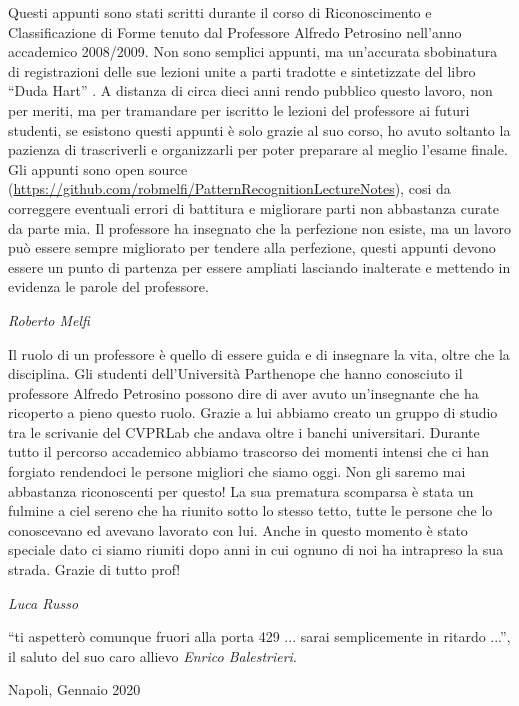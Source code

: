 %
%
%

\preface

Questi appunti sono stati scritti durante il corso di Riconoscimento e Classificazione di Forme tenuto dal Professore Alfredo Petrosino nell’anno accademico 2008/2009. Non sono semplici appunti, ma un’accurata sbobinatura di registrazioni delle sue lezioni unite a parti tradotte e sintetizzate del libro “Duda Hart” \cite{duda}. 
A distanza di circa dieci anni rendo pubblico questo lavoro, non per meriti, ma per tramandare per iscritto le lezioni del professore ai futuri studenti, se esistono questi appunti è solo grazie al suo corso, ho avuto soltanto la pazienza di trascriverli e organizzarli per poter preparare al meglio l’esame finale. \\
Gli appunti sono open source (\url{https://github.com/robmelfi/PatternRecognitionLectureNotes}), cosi da correggere eventuali errori di battitura e migliorare parti non abbastanza curate da parte mia. 
Il professore ha insegnato che la perfezione non esiste, ma un lavoro può essere sempre migliorato per tendere alla perfezione, questi appunti devono essere un punto di partenza per essere ampliati lasciando inalterate e mettendo in evidenza le parole del professore. 




\begin{flushright}\noindent
\hfill {\it Roberto Melfi}\\
\end{flushright}
\vspace{0.5cm}

\noindent Il ruolo di un professore è quello di essere guida e di insegnare la vita, oltre che la disciplina.
Gli studenti dell’Università Parthenope che hanno conosciuto il professore Alfredo Petrosino possono dire di aver avuto un’insegnante che ha ricoperto a pieno questo ruolo.
Grazie a lui abbiamo creato un gruppo di studio tra le scrivanie del CVPRLab che andava oltre i banchi universitari.
Durante tutto il percorso accademico abbiamo trascorso dei momenti intensi che ci han forgiato rendendoci le persone migliori che siamo oggi. Non gli saremo mai abbastanza riconoscenti per questo!
La sua prematura scomparsa è stata un fulmine a ciel sereno che ha riunito sotto lo stesso tetto, tutte le persone che lo conoscevano ed avevano lavorato con lui. Anche in questo momento è stato speciale dato ci siamo riuniti dopo anni in cui ognuno di noi ha intrapreso la sua strada.
Grazie di tutto prof!\\

\begin{flushright}\noindent
\hfill {\it Luca Russo}\\
\end{flushright}
\vspace{0.5cm}
“ti aspetterò comunque fruori alla porta 429 ... sarai semplicemente in ritardo ...”, il saluto del suo caro allievo \emph{Enrico Balestrieri}.

\vspace{0.5cm}
Napoli, Gennaio 2020





